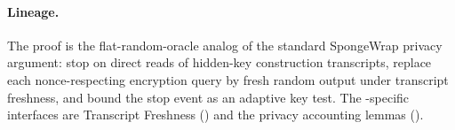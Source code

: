 \paragraph{Lineage.}
The proof is the flat-random-oracle analog of the standard
SpongeWrap privacy argument: stop on direct reads of hidden-key
construction transcripts, replace each nonce-respecting encryption
query by fresh random output under transcript freshness, and bound the
stop event as an adaptive key test. The \TW{}-specific interfaces are
Transcript Freshness () and the privacy accounting
lemmas
().
